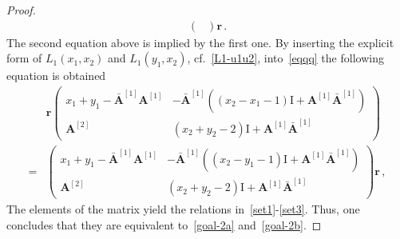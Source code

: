\documentclass[11pt]{article}
\numberwithin{equation}{section}
\newcommand{\OA}{\mathbf{A}}
\newcommand{\OAD}{\mathbf{\bar{A}}}
\newcommand{\ID}{\mathrm{I}}
\begin{document}
\begin{proof}
\begin{equation}
\begin{split}
\begin{pmatrix}
		\end{pmatrix}\mathbf{r}\,.
	\end{split}
\end{equation}
The second equation above is implied by the first one.
By inserting the explicit form of $L_{1}(x_{1},x_{2})$ and $L_{1}(y_{1},x_{2})$, cf.~\eqref{L1-u1u2}, into~\eqref{eqqq} the following equation is obtained
\begin{equation}\label{intermediate}
	\begin{split}
		&\mathbf{r} \left(\begin{array}{cc}
			x_{1}+y_{1}-\OAD^{[1]}\OA^{[1]}&-\OAD^{[1]}\left((x_{2}-x_{1}-1)\ID+\OA^{[1]}\OAD^{[1]}\right)\\
			\OA^{[2]}&(x_{2}+y_{2}-2)\ID+\OA^{[1]}\OAD^{[1]}
		\end{array}\right)
		\\=&
		\left(\begin{array}{cc}
			x_{1}+y_{1}-\OAD^{[1]}\OA^{[1]}&-\OAD^{[1]}\left((x_{2}-y_{1}-1)\ID+\OA^{[1]}\OAD^{[1]}\right)\\
			\OA^{[2]}&(x_{2}+y_{2}-2)\ID+\OA^{[1]}\OAD^{[1]}
		\end{array}\right)\mathbf{r}\,,
	\end{split}
\end{equation}
The elements of the matrix yield the relations in~\eqref{set1}-\eqref{set3}.
Thus, one concludes that they are equivalent to~\eqref{goal-2a} and~\eqref{goal-2b}. 

\end{proof}
\end{document}
